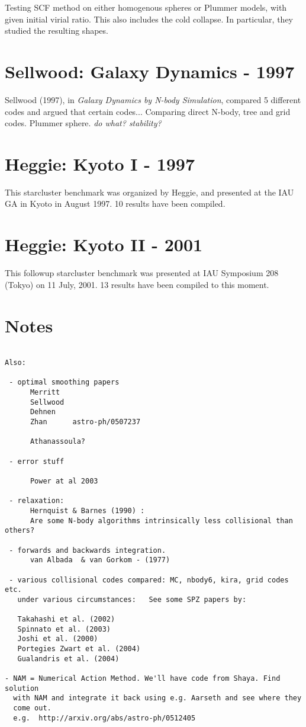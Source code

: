 Testing SCF method on either homogenous spheres or Plummer models, with
given initial virial ratio. This also includes the cold collapse. In
particular, they studied the resulting shapes.

\section{Sellwood: Galaxy Dynamics - 1997}

Sellwood (1997), in {\it Galaxy Dynamics by N-body Simulation},
compared 5 different codes and argued that certain codes...
Comparing direct N-body, tree and grid codes. Plummer
sphere. {\it do what? stability?}


\section{Heggie: Kyoto I - 1997}

This starcluster benchmark was 
organized by Heggie, and presented at the IAU GA in Kyoto in August 1997. 10 results
have been compiled.

\section{Heggie: Kyoto II - 2001}

This followup starcluster benchmark was 
presented at IAU Symposium 208 (Tokyo) on 11 July, 2001. 13 results
have been compiled to this moment.

\section{Notes}
\begin{verbatim}

Also:

 - optimal smoothing papers
      Merritt
      Sellwood
      Dehnen
      Zhan      astro-ph/0507237

      Athanassoula?

 - error stuff

      Power at al 2003

 - relaxation:
      Hernquist & Barnes (1990) : 
      Are some N-body algorithms intrinsically less collisional than others?

 - forwards and backwards integration. 
      van Albada  & van Gorkom - (1977)

 - various collisional codes compared: MC, nbody6, kira, grid codes etc.
   under various circumstances:   See some SPZ papers by:

   Takahashi et al. (2002)
   Spinnato et al. (2003)  
   Joshi et al. (2000)
   Portegies Zwart et al. (2004)
   Gualandris et al. (2004)

- NAM = Numerical Action Method. We'll have code from Shaya. Find solution
  with NAM and integrate it back using e.g. Aarseth and see where they 
  come out.
  e.g.  http://arxiv.org/abs/astro-ph/0512405
   

\end{verbatim}

